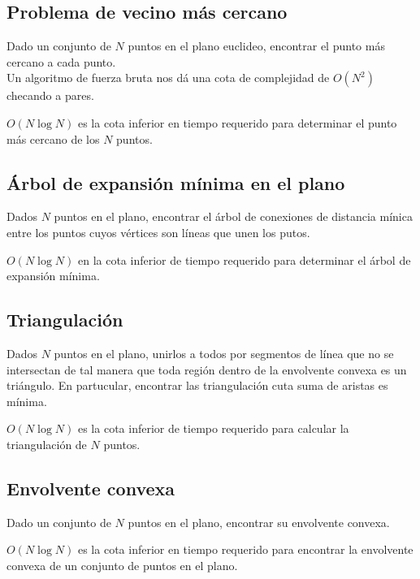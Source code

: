 \subsection{Problema de vecino más cercano}
Dado un conjunto de $N$ puntos en el plano euclideo, encontrar el punto más cercano a cada punto. \\
Un algoritmo de fuerza bruta nos dá una cota de complejidad de $O(N^2)$ checando a pares.

\begin{theorem}
$O(N \log N)$ es la cota inferior en tiempo requerido para determinar el punto más cercano de los $N$ puntos.
\end{theorem}

\subsection{Árbol de expansión mínima en el plano}
Dados $N$ puntos en el plano, encontrar el árbol de conexiones de distancia mínica entre los puntos cuyos vértices son líneas que unen los putos.

\begin{theorem}
$O(N \log N)$ en la cota inferior de tiempo requerido para determinar el árbol de expansión mínima.
\end{theorem}

\subsection{Triangulación}
Dados $N$ puntos en el plano, unirlos a todos por segmentos de línea que no se intersectan de tal manera que toda región dentro de la envolvente convexa es un triángulo. En partucular, encontrar las triangulación cuta suma de aristas es mínima.

\begin{theorem}
$O(N \log N)$ es la cota inferior de tiempo requerido para calcular la triangulación de $N$ puntos.
\end{theorem}

\subsection{Envolvente convexa}
Dado un conjunto de $N$ puntos en el plano, encontrar su envolvente convexa.

\begin{theorem}
$O(N \log N)$ es la cota inferior en tiempo requerido para encontrar la envolvente convexa de un conjunto de puntos en el plano.
\end{theorem}

